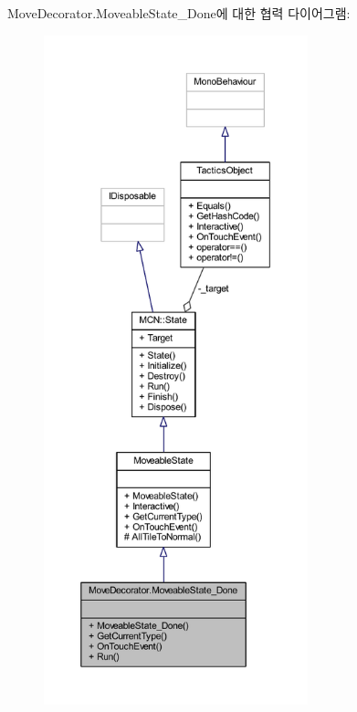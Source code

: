 Move\+Decorator.\+Moveable\+State\+\_\+\+Done에 대한 협력 다이어그램\+:
\nopagebreak
\begin{figure}[H]
\begin{center}
\leavevmode
\includegraphics[height=550pt]{class_move_decorator_1_1_moveable_state___done__coll__graph}
\end{center}
\end{figure}
